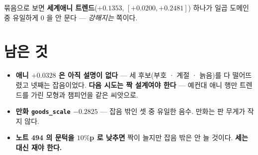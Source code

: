 \documentclass[11pt]{article}
\begin{document}
묶음으로 보면 \textbf{세계애니 트렌드}($+0.1353$, $[+0.0200, +0.2481]$)
하나가 일곱 도메인 중 유일하게 $0$ 을 안 문다 --- \emph{강해지는} 쪽이다.

\section*{남은 것}

\begin{itemize}
\item \textbf{애니 $+0.0328$ 은 아직 설명이 없다} --- 세 후보(부호 ·
계절 · 늙음)를 다 떨어뜨렸고 넷째는 잡음이었다. \textbf{다음 시도는 짝
설계여야 한다} --- 예컨대 애니 행만 트렌드를 가린 모형과 챔피언을 같은
씨앗으로.
\item \textbf{만화 \texttt{goods\_scale} $-0.2825$} --- 잡음 밖인 셋 중
유일한 음수. 만화는 판 무게가 작지 않다.
\item \textbf{노트 494 의 문턱을 $10\%$p 로 낮추면} 짝이 늘지만 잡음
밖은 안 늘 것이다. \textbf{세는 대신 재야 한다.}
\end{itemize}
\end{document}
